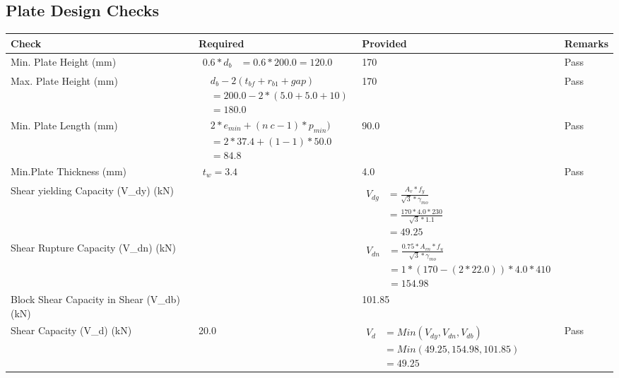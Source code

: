 \documentclass{article}%
\begin{document}
\subsection{Plate Design Checks}%
\label{subsec:PlateDesignChecks}%
\renewcommand{\arraystretch}{1.2}%
\begin{longtable}{|p{4cm}|p{5cm}|p{5.5cm}|p{1.5cm}|}%
\hline%
\rowcolor{OsdagGreen}%
Check&Required&Provided&Remarks\\%
\hline%
\endhead%
\hline%
Min. Plate Height (mm)&$\begin{aligned}0.6 * d_b&= 0.6 * 200.0=120.0\end{aligned}$&170&Pass\\%
\hline%
Max. Plate Height (mm)&$\begin{aligned} &d_b - 2 (t_{bf} + r_{b1} + gap)\\ &=200.0- 2* (5.0+5.0+ 10)\\ &=180.0\end{aligned}$&170&Pass\\%
\hline%
Min. Plate Length (mm)&$\begin{aligned} &2*e_{min} + (n~c-1) * p_{min})\\ &=2*37.4+(1-1) * 50.0\\ &=84.8\end{aligned}$&90.0&Pass\\%
\hline%
Min.Plate Thickness (mm)&$\begin{aligned} t_w=3.4\end{aligned}$&4.0&Pass\\%
\hline%
Shear yielding Capacity (V\_dy) (kN)&&$\begin{aligned} V_{dg} &= \frac{A_v*f_y}{\sqrt{3}*\gamma_{mo}}\\ &=\frac{170*4.0*230}{\sqrt{3}*1.1}\\ &=49.25\end{aligned}$&\\%
\hline%
Shear Rupture Capacity (V\_dn) (kN)&&$\begin{aligned} V_{dn} &= \frac{0.75*A_{vn}*f_u}{\sqrt{3}*\gamma_{mo}}\\ &=1*(170-(2*22.0))*4.0*410\\ &=154.98\end{aligned}$&\\%
\hline%
Block Shear Capacity in Shear (V\_db) (kN)&&101.85&\\%
\hline%
Shear Capacity (V\_d) (kN)&20.0&$\begin{aligned} V_d &= Min(V_{dy},V_{dn},V_{db})\\ &= Min(49.25,154.98,101.85)\\ &=49.25\end{aligned}$&Pass\\%

\end{longtable}
\end{document}

